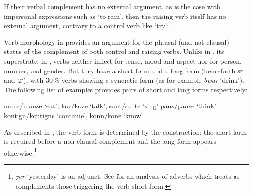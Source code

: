 \eal
{}
\zl
 
If their verbal complement has no external argument, as is the case with impersonal expressions such as  `to rain', then the raising verb itself has no external argument, contrary to a control verb like  `try':

\eal
{}
\zl

Verb morphology in  provides an argument for the phrasal (and not clausal) status of the complement of both control and raising verbs. Unlike in , its superstrate, in ,  verbs neither inflect for tense, mood and aspect nor for person, number, and
gender. But they have a short form and a long form (henceforth \textsc{sf} and \textsc{lf}), with
30\,\% verbs showing a syncretic form (as for example \emph{bwar} `drink'). The following list of examples provides pairs of short and
long forms respectively:

\eal
\ex manz/manze `eat', koz/koze `talk', sant/sante `sing'
\ex pans/panse `think', kontign/kontigne `continue', konn/kone `know'
\zl

As described in \citet[Chapter~4]{Henri2010}, the verb form is determined by the construction: the
short form is required before a non-clausal complement
  and the long form appears otherwise.\footnote{\textit{yer} `yesterday' is an adjunct. See  for an analysis of  adverbs which treats as complements those triggering the verb short form.}


